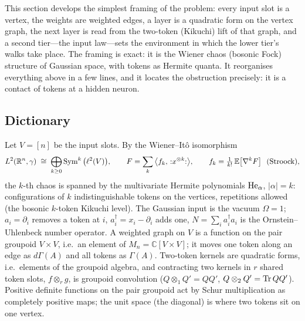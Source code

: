 \label{sec:tokens}
This section develops the simplest framing of the problem: every input slot is a vertex, the weights are weighted
edges, a layer is a quadratic form on the vertex graph, the next layer is read from the two-token (Kikuchi) lift of
that graph, and a second tier---the input law---sets the environment in which the lower tier's walks take place. The
framing is exact: it is the Wiener chaos (bosonic Fock) structure of Gaussian space, with tokens as Hermite quanta.
It reorganises everything above in a few lines, and it locates the obstruction precisely: it is a contact of tokens at
a hidden neuron.

\subsection{Dictionary}
Let $V=[n]$ be the input slots. By the Wiener--It\^o isomorphism
\[
L^2(\mathbb R^n,\gamma)\;\cong\;\bigoplus_{k\ge0}\operatorname{Sym}^k\big(\ell^2(V)\big),\qquad
F=\sum_k\big\langle f_k,\,{:}x^{\otimes k}{:}\big\rangle,\qquad f_k=\tfrac1{k!}\,\mathbb E\big[\nabla^kF\big]\ \ \text{(Stroock)},
\]
the $k$-th chaos is spanned by the multivariate Hermite polynomials $\mathrm{He}_\alpha$, $|\alpha|=k$: configurations of $k$
indistinguishable tokens on the vertices, repetitions allowed (the bosonic $k$-token Kikuchi level). The Gaussian input
is the vacuum $\Omega=1$; $a_i=\partial_i$ removes a token at $i$, $a_i^\dagger=x_i-\partial_i$ adds one, $N=\sum_ia_i^\dagger a_i$ is the
Ornstein--Uhlenbeck number operator. A weighted graph on $V$ is a function on the pair groupoid $V\times V$, i.e.\ an element
of $M_n=\mathbb C[V\times V]$; it moves one token along an edge as $d\Gamma(A)$ and all tokens as $\Gamma(A)$. Two-token kernels
are quadratic forms, i.e.\ elements of the groupoid algebra, and contracting two kernels in $r$ shared token slots,
$f\otimes_rg$, is groupoid convolution ($Q\otimes_1Q'=QQ'$, $Q\otimes_2Q'=\operatorname{Tr} QQ'$). Positive definite functions on the pair
groupoid act by Schur multiplication as completely positive maps; the unit space (the diagonal) is where two tokens sit
on one vertex.

